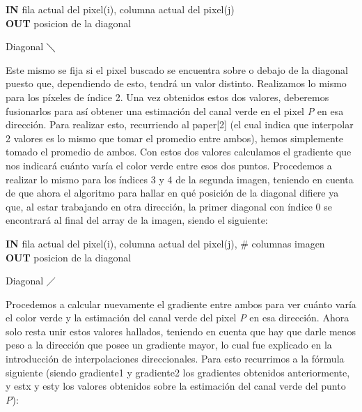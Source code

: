 \documentclass[10pt, a4paper]{article}
\begin{document}
\vspace{0.5cm}

\begin{algorithm}[H]
\textbf{IN} fila actual del pixel(i), columna actual del pixel(j) \\
\textbf{OUT} posicion de la diagonal \\
\caption{Diagonal $\diagdown$}
\end{algorithm}

\vspace{0.5cm}

Este mismo se fija si el pixel buscado se encuentra sobre o debajo de la diagonal puesto que, dependiendo de esto, tendr\'a un valor distinto. Realizamos lo mismo para los p\'ixeles de \'indice 2. Una vez obtenidos estos dos valores, deberemos fusionarlos para as\'i obtener una estimaci\'on del canal verde en el pixel \textit{P} en esa direcci\'on. Para realizar esto, recurriendo al paper[2] (el cual indica que interpolar 2 valores es lo mismo que tomar el promedio entre ambos), hemos simplemente tomado el promedio de ambos. Con estos dos valores calculamos el gradiente que nos indicar\'a cu\'anto var\'ia el color verde entre esos dos puntos. Procedemos a realizar lo mismo para los \'indices 3 y 4 de la segunda imagen, teniendo en cuenta de que ahora el algoritmo para hallar en qu\'e posici\'on de la diagonal difiere ya que, al estar trabajando en otra direcci\'on, la primer diagonal con \'indice 0 se encontrar\'a al final del array de la imagen, siendo el siguiente:

\vspace{0.5cm}
\begin{algorithm}[H]
\textbf{IN} fila actual del pixel(i), columna actual del pixel(j), \# columnas imagen \\
\textbf{OUT} posicion de la diagonal \\
\caption{Diagonal $\diagup$}
\end{algorithm}
\vspace{0.5cm}
Procedemos a calcular nuevamente el gradiente entre ambos para ver cu\'anto var\'ia el color verde y la estimaci\'on del canal verde del pixel \textit{P} en esa direcci\'on. Ahora solo resta unir estos valores hallados, teniendo en cuenta que hay que darle menos peso a la direcci\'on que posee un gradiente mayor, lo cual fue explicado en la introducci\'on de interpolaciones direccionales. Para esto recurrimos a la f\'ormula siguiente (siendo gradiente1 y gradiente2 los gradientes obtenidos anteriormente, y estx y esty los valores obtenidos sobre la estimaci\'on del canal verde del punto \textit{P}):
\end{document}
